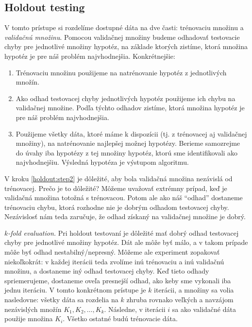 \subsection{Holdout testing}

V tomto prístupe si rozdelíme dostupné dáta na dve časti:
trénovaciu množinu a \emph{validačnú množinu}. Pomocou validačnej
množiny budeme odhadovať testovacie chyby pre jednotlivé množiny
hypotéz, na základe ktorých zistíme, ktorá množina hypotéz je
pre náš problém najvhodnejšia. Konkrétnejšie:
\begin{enumerate}
  \item Trénovaciu množinu použijeme na natrénovanie hypotéz
    z jednotlivých množín.
  \item \label{holdout:step2} Ako odhad testovacej chyby jednotlivých
    hypotéz použijeme ich chybu na validačnej množine. Podľa týchto
    odhadov zistíme, ktorá množina hypotéz je pre náš problém najvhodnejšia.
  \item Použijeme všetky dáta, ktoré máme k dispozícii (tj. z trénovacej
    aj validačnej množiny), na natrénovanie najlepšej možnej hypotézy.
    Berieme samozrejme do úvahy iba hypotézy z tej množiny hypotéz, ktorú
    sme identifikovali ako najvhodnejšiu. Výsledná hypotéza je výstupom
    algoritmu.
\end{enumerate}
 
V kroku \ref{holdout:step2} je dôležité, aby bola validačná
množina nezávislá od trénovacej. Prečo je to dôležité? Môžeme uvažovať
extrémny prípad, keď je validačná množina totožná s trénovacou. Potom
ale ako náš ``odhad'' dostaneme trénovaciu chybu, ktorá rozhodne nie
je dobrým odhadom testovacej chyby. Nezávislosť nám teda zaručuje, že
odhad získaný na validačnej množine je dobrý.

\emph{$k$-fold evaluation.} Pri holdout testovaní je dôležité mať
dobrý odhad testovacej chyby pre jednotlivé množiny hypotéz. Dát ale
môže byť málo, a v takom prípade môže byť odhad nestabilný/nepresný.
Môžeme ale experiment zopakovať niekoľkokrát: v každej iterácii teda
zvolíme inú trénovaciu a inú validačnú množinu, a dostaneme iný odhad
testovacej chyby. Keď tieto odhady spriemerujeme, dostaneme oveľa
presnejší odhad, ako keby sme vykonali iba jednu iteráciu.
V tomto konkrétnom prístupe je $k$ iterácii, a množiny sa volia
nasledovne: všetky dáta sa rozdelia na $k$ zhruba rovnako veľkých
a navzájom nezávislých množín $K_1, K_2, \ldots, K_k$. Následne,
v iterácii $i$ sa ako validačné dáta použije množina $K_i$. Všetko
ostatné budú trénovacie dáta.

